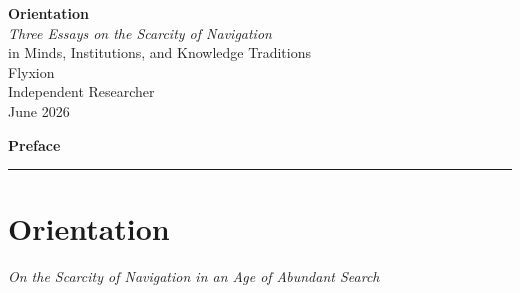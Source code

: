 \documentclass[12pt, a4paper]{article}
\theoremstyle{essaystyle}
\begin{document}
\begin{titlepage}
  \vspace*{3.5cm}
  \begin{center}
    {\LARGE\bfseries Orientation}\\[1em]
    {\large\itshape Three Essays on the Scarcity of Navigation}\\[0.6em]
    {\normalsize in Minds, Institutions, and Knowledge Traditions}\\[3em]
    {\normalsize Flyxion}\\[0.4em]
    {\small Independent Researcher}\\[3em]
    {\small June 2026}
  \end{center}
\end{titlepage}

\newpage
\tableofcontents

\newpage
{}
{}
\begin{center}
  {\Large\bfseries Preface}\\[0.5em]
  \rule{0.3\textwidth}{0.4pt}
\end{center}
\vspace{1em}



\newpage
\part{Orientation}
\begin{center}
  \large\itshape On the Scarcity of Navigation in an Age of Abundant Search
\end{center}

\bigskip
\end{document}
